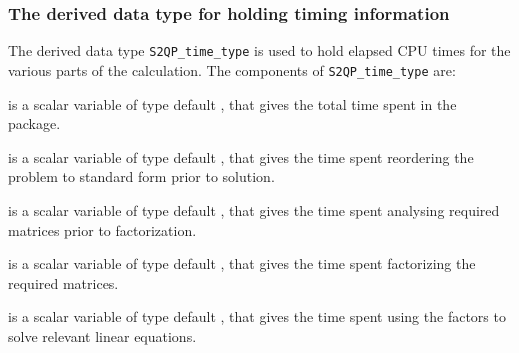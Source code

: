 \documentclass{galahad}
\newcommand{\packagename}{S2QP}
\begin{document}
\subsubsection{The derived data type for holding timing 
 information}\label{typetime}
The derived data type 
{\tt \packagename\_time\_type} 
is used to hold elapsed CPU times for the various parts of the calculation.
The components of 
{\tt \packagename\_time\_type} 
are:
\begin{description}
 is a scalar variable of type default \real, that gives
 the total time spent in the package.

 is a scalar variable of type default \real, that gives
 the time spent reordering the problem to standard form prior to solution.

 is a scalar variable of type default \real, that gives
 the time spent analysing required matrices prior to factorization.

 is a scalar variable of type default \real, that gives
 the time spent factorizing the required matrices.

 is a scalar variable of type default \real, that gives
 the time spent using the factors to solve relevant linear equations.










\end{description}
\end{document}
